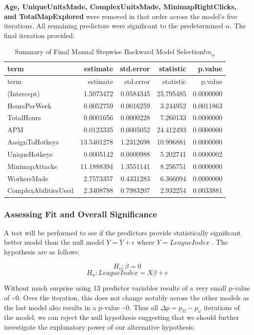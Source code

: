 \documentclass[]{article}
\begin{document}
\textbf{Age, UniqueUnitsMade, ComplexUnitsMade, MinimapRightClicks, and
TotalMapExplored} were removed in that order across the model's five
iterations. All remaining predictors were significant to the
predetermined \(\alpha\). The final iteration provided:

\begin{longtable}[]{@{}lrrrr@{}}
\caption{Summary of Final Manual Stepwise Backward Model
Selection\(lm_\omega\)}\tabularnewline
\toprule
term & estimate & std.error & statistic & p.value\tabularnewline
\midrule
\endfirsthead
\toprule
term & estimate & std.error & statistic & p.value\tabularnewline
\midrule
\endhead
(Intercept) & 1.5073472 & 0.0584345 & 25.795485 &
0.0000000\tabularnewline
HoursPerWeek & 0.0052759 & 0.0016259 & 3.244952 &
0.0011863\tabularnewline
TotalHours & 0.0001656 & 0.0000228 & 7.260133 & 0.0000000\tabularnewline
APM & 0.0123335 & 0.0005052 & 24.412493 & 0.0000000\tabularnewline
AssignToHotkeys & 13.5401278 & 1.2312698 & 10.996881 &
0.0000000\tabularnewline
UniqueHotkeys & 0.0005142 & 0.0000988 & 5.202741 &
0.0000002\tabularnewline
MinimapAttacks & 11.1888394 & 1.3551141 & 8.256751 &
0.0000000\tabularnewline
WorkersMade & 2.7573357 & 0.4331283 & 6.366094 &
0.0000000\tabularnewline
ComplexAbilitiesUsed & 2.3408788 & 0.7983207 & 2.932254 &
0.0033881\tabularnewline
\bottomrule
\end{longtable}

\hypertarget{assessing-fit-and-overall-significance}{%
\subsubsection{Assessing Fit and Overall
Significance}\label{assessing-fit-and-overall-significance}}

A test will be performed to see if the predictors provide statistically
significant better model than the null model
\(Y=\overset{\_}{Y}+\epsilon\) where \(Y=LeagueIndex\) . The hypothesis
are as follows:

\[H_o:\beta=0\] \[H_a:LeagueIndex=X\beta+\epsilon\]

Without much surprise using 13 predictor variables results of a very
small p-value of \textasciitilde{}0. Over the iteration, this does not
change notably across the other models as the last model also results in
a p-value \textasciitilde{}0. Thus all \(\Delta p=p_\Omega-p_\omega\)
iterations of the model, we can reject the null hypothesis suggesting
that we should further investigate the explanatory power of our
alternative hypothesis.
\end{document}
